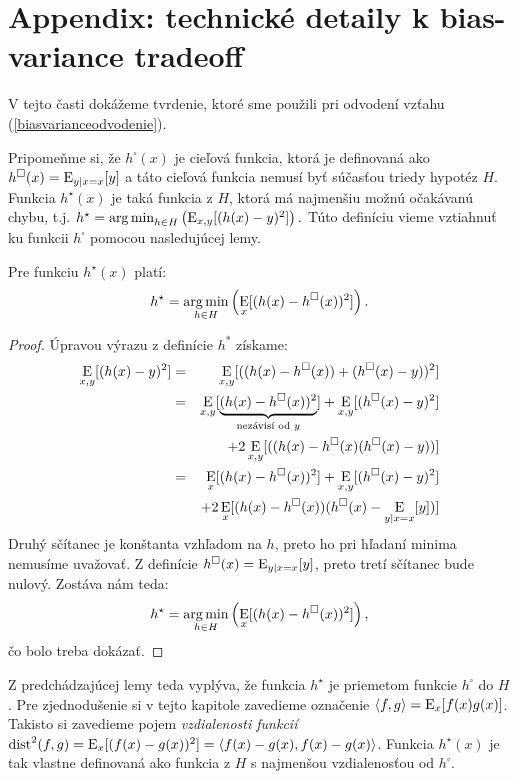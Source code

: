 \section{Appendix: technické detaily k bias-variance tradeoff}
\label{tradeoff:tech}

\def\dist{\text{dist}}

V tejto časti dokážeme tvrdenie, ktoré sme použili pri odvodení vzťahu
(\ref{biasvarianceodvodenie}).

Pripomeňme si, že $h^{\square}(x)$ je cieľová funkcia, ktorá je
definovaná ako $h^{\square}(x)=\operatorname*{\mathrm{E}}_{y|x=x}[y]$ a táto cieľová funkcia
nemusí byť súčasťou triedy hypotéz $H$.
Funkcia $h^\star(x)$ je taká funkcia z $H$, ktorá má najmenšiu možnú
očakávanú chybu, t.j. $h^\star = \operatorname*{{arg\,min}}_{h\in H} \left(
\operatorname*{\mathrm{E}}_{x,y}[(h(x)-y)^2] \right).$ Túto definíciu vieme vztiahnuť ku funkcii
$h^\square$ pomocou nasledujúcej lemy.

\begin{lemma}
  Pre funkciu $h^\star(x)$ platí:
  $$h^\star=\operatorname*{{arg\,min}}_{h\in H} \left(\operatorname*{\mathrm{E}}_{x}[(h(x)-h^\square(x))^2] \right).$$
\label{lemaprojekcia}
\end{lemma}

\begin{proof}
Úpravou výrazu z definície $h^*$ získame:
\begin{eqnarray*}
  \operatorname*{\mathrm{E}}_{x,y}[(h(x)-y)^2] & = & \operatorname*{\mathrm{E}}_{x,y}[((h(x)-h^{\square}(x))+(h^{\square}(x)-y))^2]\\
  & = & \operatorname*{\mathrm{E}}_{x,y}[\underbrace{(h(x)-h^{\square}(x))^2}_{\text{nezávisí od $y$}}] + \operatorname*{\mathrm{E}}_{x,y}[(h^{\square}(x)-y)^2]\\ && + 2\operatorname*{\mathrm{E}}_{x,y}[((h(x)-h^{\square}(x)(h^{\square}(x)-y))]\\
    & = & \operatorname*{\mathrm{E}}_x[(h(x)-h^{\square}(x))^2] + \operatorname*{\mathrm{E}}_{x,y}[(h^{\square}(x)-y)^2]\\&&+ 2\operatorname*{\mathrm{E}}_x[(h(x)-h^{\square}(x))(h^{\square}(x)-\operatorname*{\mathrm{E}}_{y|x=x}[y])]
\end{eqnarray*}
Druhý sčítanec je konštanta vzhľadom na $h$, preto ho pri hľadaní
minima nemusíme uvažovať. Z definície $h^{\square}(x)=\operatorname*{\mathrm{E}}_{y|x=x}[y]$, preto tretí
sčítanec bude nulový. Zostáva nám teda:
$$h^\star=\operatorname*{{arg\,min}}_{h\in H} \left(\operatorname*{\mathrm{E}}_{x}[(h(x)-h^\square(x))^2] \right),$$
čo bolo treba dokázať.
\end{proof}

\noindent
Z predchádzajúcej lemy teda vyplýva, že funkcia $h^\star$ je priemetom
funkcie $h^\square$ do $H$.
Pre zjednodušenie si v tejto kapitole
zavedieme označenie $\langle f,g \rangle = \operatorname*{\mathrm{E}}_x[f(x)g(x)]$.  Takisto
si zavedieme pojem \emph{vzdialenosti funkcií}
$\dist^2(f,g)=\E_x[(f(x)-g(x))^2]=\langle f(x)-g(x),f(x)-g(x)
\rangle$.  Funkcia $h^{\star}(x)$ je tak vlastne definovaná ako
funkcia z $H$ s najmenšou vzdialenosťou od $h^\square$.

